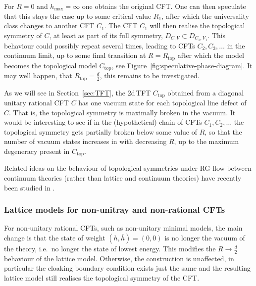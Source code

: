 \documentclass[11pt,a4paper]{article}
\numberwithin{equation}{section}
\begin{document}
For $R=0$ and $h_\mathrm{max} = \infty$ one obtains the original CFT. One can then speculate that this stays the case up to some critical value $R_1$, after which the universality class changes to another CFT $C_1$. The CFT $C_1$ will then realise the topological symmetry of $C$, at least as part of its full symmetry, $D_{C,V} \subset D_{C_1,V_1}$. This behaviour could possibly repeat several times, leading to CFTs $C_2,C_3,\dots$ in the continuum limit, up to some final transition at $R=R_\mathrm{top}$ after which the model becomes the topological model $C_\mathrm{top}$, see Figure~\ref{fig:speculative-phase-diagram}. 
It may well happen, that $R_\mathrm{top}=\frac d2$, this remains to be investigated.

As we will see in Section~\ref{sec:TFT}, the 2d\,TFT  $C_\mathrm{top}$ obtained from a diagonal unitary rational CFT $C$ has one vacuum state for each topological line defect of $C$. That is, the topological symmetry is maximally broken in the vacuum. It would be interesting to see if in the (hypothetical) chain of CFTs $C_1,C_2,\dots$ the topological symmetry gets partially broken below some value of $R$, so that the number of vacuum states increases in with decreasing $R$, up to the maximum degeneracy present in $C_\mathrm{top}$.

Related ideas on the behaviour of topological symmetries under RG-flow between continuum theories (rather than lattice and continuum theories) have recently been studied in \cite{Chang:2018iay,Kikuchi:2021qxz}.


\subsubsection*{Lattice models for non-unitray and non-rational CFTs}

For non-unitary rational CFTs, such as non-unitary minimal models, the main change is that the state of weight $(h,\overline h) = (0,0)$ is no longer the vacuum of the theory, i.e.\ no longer the state of lowest energy. This modifies the $R \to \frac d2$ behaviour of the lattice model. Otherwise, the construction is unaffected, in particular the cloaking boundary condition exists just the same and the resulting lattice model still realises the topological symmetry of the CFT.
\end{document}
